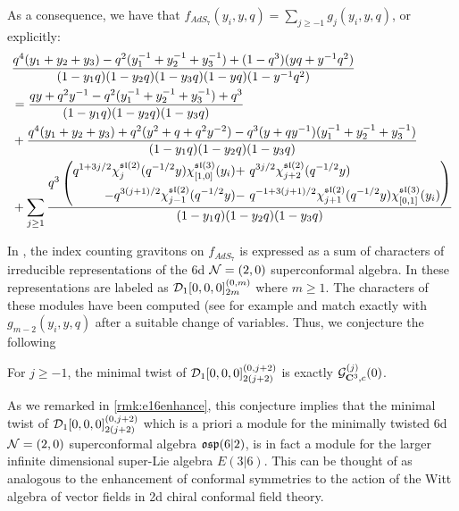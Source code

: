 \documentclass[../main.tex]{subfiles}
\begin{document}
\parsec[]
As a consequence, we have that $f_{AdS_7} (y_i, y, q) = \sum_{j\geq -1} g_j (y_i, y, q)$, or explicitly:
\begin{align*}
& \frac{q^4(y_1+y_2+y_3)-q^2(y_1^{-1} + y_2^{-1} + y_3^{-1})+ (1-q^3)(yq + y^{-1} q^2)}{(1-y_1 q)(1-y_2 q)(1-y_3 q)(1-yq)(1-y^{-1} q^2)}  \\ 
& =  \frac{qy + q^2y^{-1} - q^2(y^{-1}_1+y^{-1}_2+y^{-1}_3) + q^3}{(1-y_1q) (1-y_2 q) (1-y_3 q)} \\
& +  \frac{q^4(y_1+y_2+y_3) + q^2 (y^2 + q + q^2 y^{-2}) - q^{3} (y + q y^{-1})(y_1^{-1} + y_2^{-1} + y_3^{-1})}{(1-y_1q) (1-y_2 q) (1-y_3 q)} \\
& + \sum_{j\geq 1} \frac{ q^{3} \left( \begin{aligned} q^{1 + 3 j/2} \chi^{\mathfrak{sl}(2)}_{j}(q^{-1/2} y)\chi^{\mathfrak{sl}(3)}_{[1,0]}(y_i) + \  & q^{3j/2} \chi^{\mathfrak{sl}(2)}_{j+2}(q^{-1/2} y)  \\
 - q^{3(j+1)/2} \chi^{\mathfrak{sl}(2)}_{j-1}(q^{-1/2}y) - \ & q^{-1 + 3(j+1)/2} \chi^{\mathfrak{sl}(2)}_{j+1} (q^{-1/2} y) \chi^{\mathfrak{sl}(3)}_{[0,1]}(y_i) \end{aligned} \right)}{(1-y_1 q)(1-y_2q)(1-y_3q)}
\end{align*}

In \cite[Eq. (3.22, 3.23)]{Bhattacharya:2008zy}, the index counting gravitons on $f_{AdS_7}$ is expressed as a sum of characters of irreducible representations of the 6d $\mathcal{N} = (2,0)$ superconformal algebra. In \cite[Table 24]{cordova2016multiplets} these representations are labeled as $\mathcal{D}_1[0,0,0]^{(0,m)}_{2m}$ where $m \geq 1$. The characters of these modules have been computed (see for example \cite[Eq. (166)]{Arai_2020} and match exactly with $g_{m-2}(y_i, y, q)$ after a suitable change of variables. Thus, we conjecture the following

\begin{conj}
For $j\geq -1$, the minimal twist of $\mathcal{D}_1[0,0,0]^{(0,j+2)}_{2(j+2)}$ is exactly $\mathcal{G}^{(j)}_{\mathbf{C}^3, c}(0)$.
\end{conj}

\begin{rmk}\label{rmk:e36enhance}
As we remarked in \ref{rmk:e16enhance}, this conjecture implies that the minimal twist of $\mathcal{D}_1[0,0,0]^{(0,j+2)}_{2(j+2)}$ which is a priori a module for the minimally twisted 6d $\mathcal{N}=(2,0)$ superconformal algebra $\mathfrak{osp}(6|2)$, is in fact a module for the larger infinite dimensional super-Lie algebra $E(3|6)$. This can be thought of as analogous to the enhancement of conformal symmetries to the action of the Witt algebra of vector fields in 2d chiral conformal field theory.
\end{rmk}
\end{document}
